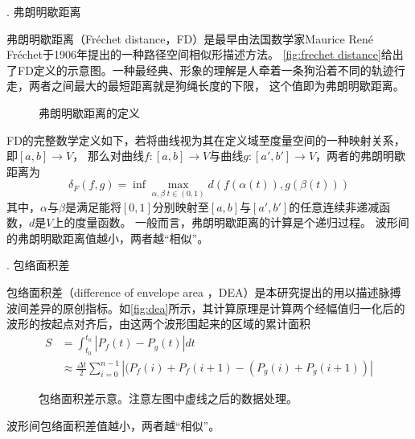 . 弗朗明歇距离

弗朗明歇距离（Fréchet distance，FD）是最早由法国数学家Maurice René Fréchet于1906年提出的一种路径空间相似形描述方法\cite{Wien1994,Kaveh2013,GN2017}。
\autoref{fig:frechet distance}给出了FD定义的示意图。一种最经典、形象的理解是人牵着一条狗沿着不同的轨迹行走，两者之间最大的最短距离就是狗绳长度的下限，
这个值即为弗朗明歇距离。
\begin{figure}[htbp]
    \centering
    \quad
    \caption{\label{fig:frechet distance}弗朗明歇距离的定义}
\end{figure}

FD的完整数学定义如下，若将曲线视为其在定义域至度量空间的一种映射关系，即$[a,b]\rightarrow V$，
那么对曲线$f:[a,b]\rightarrow V$与曲线$g:[a',b']\rightarrow V$，两者的弗朗明歇距离为
\begin{equation}
    \label{equ:frechet distance}
    \delta_F(f,g)=\inf \max \limits_{\alpha,\beta \; t \in (0,1)} d(f(\alpha(t)), g(\beta(t)))
\end{equation}
其中，$\alpha$与$\beta$是满足能将$[0,1]$分别映射至$[a,b]$与$[a',b']$的任意连续非递减函数，$d$是$V$上的度量函数\cite{Wien1994}。
一般而言，弗朗明歇距离的计算是个递归过程。
波形间的弗朗明歇距离值越小，两者越“相似”。

. 包络面积差

包络面积差（difference of envelope area ，DEA）是本研究提出的用以描述脉搏波间差异的原创指标。如\autoref{fig:dea}所示，其计算原理是计算两个经幅值归一化后的波形的按起点对齐后，由这两个波形围起来的区域的累计面积
\begin{equation}
    \label{equ:dea}
    \begin{aligned}
        S &= \int_{t_0}^{t_n}|P_f(t)-P_g(t)|dt\\
        &\approx \frac{\Delta t}{2} \sum_{i=0}^{n-1}{|(P_f(i)+P_f(i+1)-(P_g(i)+P_g(i+1))|}
    \end{aligned}
\end{equation}
\begin{figure}[htbp]
    \centering
    \quad
    \caption[包络面积差示意]{\label{fig:dea}包络面积差示意。注意左图中虚线之后的数据处理。}
\end{figure}
波形间包络面积差值越小，两者越“相似”。

